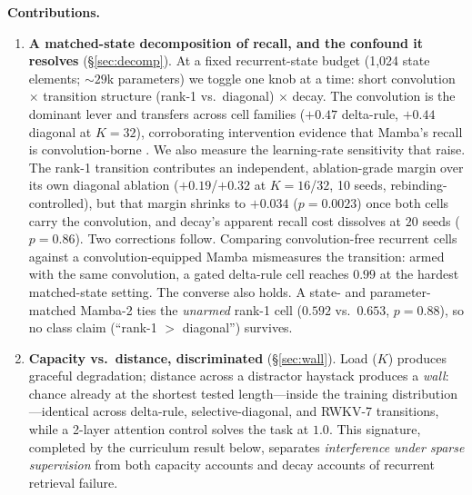 \documentclass{article}
\begin{document}
\textbf{Contributions.}
\begin{enumerate}[leftmargin=1.4em,itemsep=2pt]
\item \textbf{A matched-state decomposition of recall, and the confound it resolves} (\S\ref{sec:decomp}). At a fixed recurrent-state budget (1{,}024 state elements; ${\sim}29$k parameters) we toggle one knob at a time: short convolution $\times$ transition structure (rank-1 vs.\ diagonal) $\times$ decay. The convolution is the dominant lever and transfers across cell families ($+0.47$ delta-rule, $+0.44$ diagonal at $K{=}32$), corroborating intervention evidence that Mamba's recall is convolution-borne \citep{arora2025convs,parnichkun2025ess}. We also measure the learning-rate sensitivity that \citet{okpekpe2025recall} raise. The rank-1 transition contributes an independent, ablation-grade margin over its own diagonal ablation ($+0.19$/$+0.32$ at $K{=}16$/$32$, 10 seeds, rebinding-controlled), but that margin shrinks to $+0.034$ ($p{=}0.0023$) once both cells carry the convolution, and decay's apparent recall cost dissolves at $20$ seeds ($p{=}0.86$). Two corrections follow. Comparing convolution-free recurrent cells against a convolution-equipped Mamba mismeasures the transition: armed with the same convolution, a gated delta-rule cell reaches $0.99$ at the hardest matched-state setting. The converse also holds. A state- and parameter-matched Mamba-2 ties the \emph{unarmed} rank-1 cell ($0.592$ vs.\ $0.653$, $p{=}0.88$), so no class claim (``rank-1 $>$ diagonal'') survives.
\item \textbf{Capacity vs.\ distance, discriminated} (\S\ref{sec:wall}). Load ($K$) produces graceful degradation; distance across a distractor haystack produces a \emph{wall}: chance already at the shortest tested length---inside the training distribution---identical across delta-rule, selective-diagonal, and RWKV-7 transitions, while a 2-layer attention control solves the task at $1.0$. This signature, completed by the curriculum result below, separates \emph{interference under sparse supervision} from both capacity accounts and decay accounts \citep{echo2026} of recurrent retrieval failure.

\end{enumerate}
\end{document}
